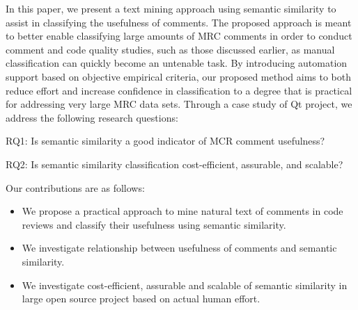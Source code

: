 



In this paper, we present a text mining approach using semantic similarity to assist in classifying the usefulness of comments.
The proposed approach is meant to better enable classifying large amounts of MRC comments in order to conduct comment and code quality studies, such as those discussed earlier, as manual classification can quickly become an untenable task.
By introducing automation support based on objective empirical criteria,
our proposed method aims to both reduce effort and increase confidence in classification to a degree that is practical for addressing very large MRC data sets.
Through a case study of Qt project, we address the following research questions:
\begin{ResearchQuestions}
\item[RQ1:] Is semantic similarity a good indicator of MCR comment usefulness?\\
\item[RQ2:] Is semantic similarity classification cost-efficient, assurable, and scalable?
\end{ResearchQuestions}

Our contributions are as follows:
\begin{itemize}
\item We propose a practical approach to mine natural text of comments in code reviews and classify their usefulness using semantic similarity.
\item We investigate relationship between usefulness of comments and semantic similarity.
\item We investigate cost-efficient, assurable and scalable of semantic similarity in large open source project based on actual human effort.
\end{itemize}



